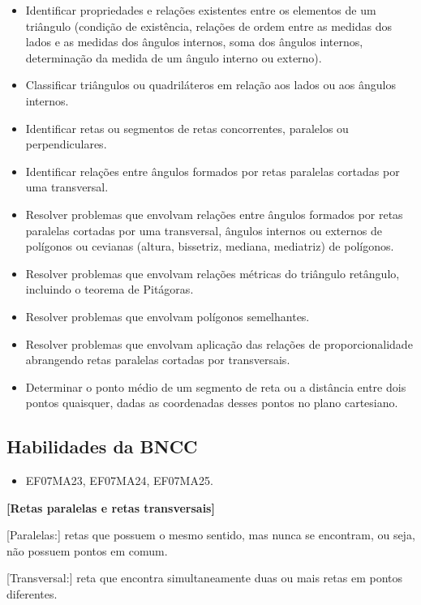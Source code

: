\begin{itemize}
\item Identificar propriedades e relações existentes
entre os elementos de um triângulo (condição de existência, relações de
ordem entre as medidas dos lados e as medidas dos ângulos internos, soma
dos ângulos internos, determinação da medida de um ângulo interno ou
externo).
\item
  Classificar triângulos ou quadriláteros em relação aos lados ou aos
  ângulos internos.
\item
  Identificar retas ou segmentos de retas concorrentes, paralelos ou
  perpendiculares.
\item
  Identificar relações entre ângulos formados por retas paralelas
  cortadas por uma transversal.
\item
  Resolver problemas que envolvam relações entre ângulos formados por
  retas paralelas cortadas por uma transversal, ângulos internos ou
  externos de polígonos ou cevianas (altura, bissetriz, mediana,
  mediatriz) de polígonos.
\item
  Resolver problemas que envolvam relações métricas do triângulo
  retângulo, incluindo o teorema de Pitágoras.
\item
  Resolver problemas que envolvam polígonos semelhantes.
\item
  Resolver problemas que envolvam aplicação das relações de
  proporcionalidade abrangendo retas paralelas cortadas por
  transversais.
\item
  Determinar o ponto médio de um segmento de reta ou a distância entre
  dois pontos quaisquer, dadas as coordenadas desses pontos no plano
  cartesiano.
\end{itemize}

\subsection{Habilidades da BNCC}
\begin{itemize}
\item EF07MA23, EF07MA24, EF07MA25.
\end{itemize}

\textbf{{[}Retas paralelas e retas transversais{]}}

{[}Paralelas:{]} retas que possuem o mesmo sentido, mas nunca se
encontram, ou seja, não possuem pontos em comum.

{[}Transversal:{]} reta que encontra simultaneamente duas ou mais retas
em pontos diferentes.

